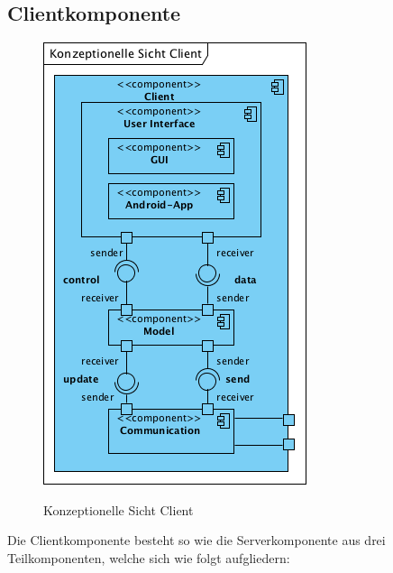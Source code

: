\documentclass[fontsize=12pt,paper=a4,twoside]{scrartcl}
\begin{document}
\subsection{Clientkomponente}
\label{sec:client}

\begin{figure} [H] 
\caption{Konzeptionelle Sicht Client}  \centering
	\includegraphics[scale=1.7]{Diagramme/KonzeptionelleSichtClient.png} 
	\label{pic:konzeptionellesichtclient} 
\end{figure}

Die Clientkomponente besteht so wie die Serverkomponente aus drei Teilkomponenten, welche sich wie folgt aufgliedern:
\end{document}
